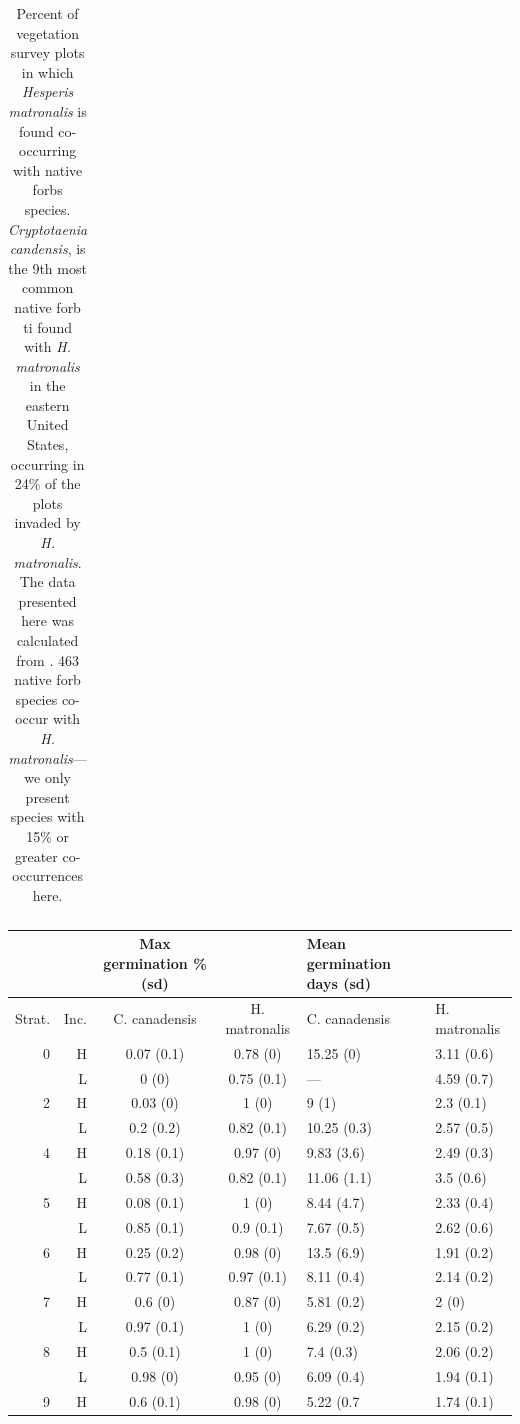 \documentclass{article}[11pt]
\begin{document}
\begin{table}[hp]
\begin{tabular}{|r|l|c|}
   \hline
\end{tabular}
\caption{Percent of vegetation survey plots in which \emph{Hesperis matronalis} is found co-occurring with native forbs species. \emph{Cryptotaenia candensis}, is the 9th most common native forb ti found with \emph{H. matronalis} in the eastern United States, occurring in 24\% of the plots invaded by \emph{H. matronalis}. The data presented here was calculated from \citet{Petri:2022tp}. 463 native forb species co-occur with  \emph{H. matronalis}---we only present species with 15\% or greater co-occurrences here. } 
\label{tab:occoverlap}
\end{table}



\begin{table}[hp]
\centering
\begin{tabular}{|rr|cc|ll|}
   \hline
     & & Max germination \% (sd) & &
   Mean germination days (sd) & \\ 
  \hline
  Strat. & Inc.  & C. canadensis & H. matronalis & C. canadensis & H. matronalis \\ 
  \hline
0 & H & 0.07 (0.1) & 0.78 (0) & 15.25 (0) & 3.11 (0.6) \\ 
  & L & 0 (0) & 0.75 (0.1) & --- & 4.59 (0.7) \\ 
   \hline
 2 & H & 0.03 (0) & 1 (0) & 9 (1) & 2.3 (0.1) \\ 
  & L & 0.2 (0.2) & 0.82 (0.1) & 10.25 (0.3) & 2.57 (0.5) \\ 
   \hline
 4 & H & 0.18 (0.1) & 0.97 (0) & 9.83 (3.6) & 2.49 (0.3) \\ 
 & L & 0.58 (0.3) & 0.82 (0.1) & 11.06 (1.1) & 3.5 (0.6) \\ 
    \hline
    5 & H & 0.08 (0.1) & 1 (0) & 8.44 (4.7) & 2.33 (0.4) \\ 
 & L & 0.85 (0.1) & 0.9 (0.1) & 7.67 (0.5) & 2.62 (0.6) \\ 
   \hline
   6 & H & 0.25 (0.2) & 0.98 (0) & 13.5 (6.9) & 1.91 (0.2) \\ 
  & L & 0.77 (0.1) & 0.97 (0.1) & 8.11 (0.4) & 2.14 (0.2) \\ 
    \hline
    7 & H & 0.6 (0) & 0.87 (0) & 5.81 (0.2) & 2 (0) \\ 
 & L & 0.97 (0.1) & 1 (0) & 6.29 (0.2) & 2.15 (0.2) \\ 
    \hline
    8 & H & 0.5 (0.1) & 1 (0) & 7.4 (0.3) & 2.06 (0.2) \\ 
 & L & 0.98 (0) & 0.95 (0) & 6.09 (0.4) & 1.94 (0.1) \\ 
      \hline
   9 & H & 0.6 (0.1) & 0.98 (0) & 5.22 (0.7 & 1.74 (0.1) \\ 

\end{tabular}
\end{table}
\end{document}
